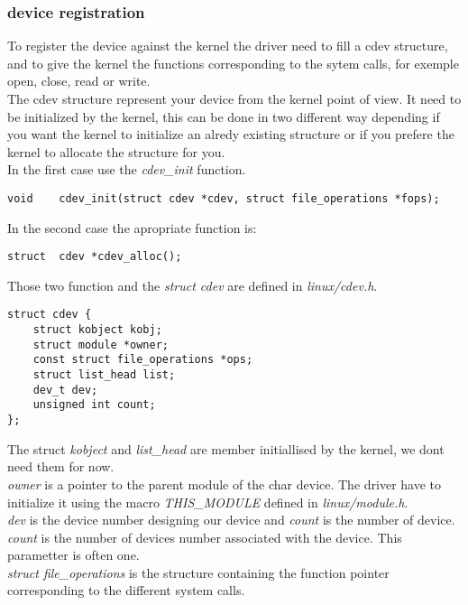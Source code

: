 \documentclass[11pt]{report}
\begin{document}
\subsubsection{device registration}
To register the device against the kernel the driver need to fill a cdev
structure, and to give the kernel the functions corresponding to the sytem
calls, for exemple open, close, read or write.\\
The cdev structure represent your device from the kernel point of view.
It need to be initialized by the kernel, this can be done in two
different way depending if you want the kernel to initialize an alredy existing
structure or if you prefere the kernel to allocate the structure for you.\\
In the first case use the {\it cdev\_init} function.
\begin{lstlisting}
void    cdev_init(struct cdev *cdev, struct file_operations *fops);
\end{lstlisting}
In the second case the apropriate function is:
\begin{lstlisting}
struct  cdev *cdev_alloc();
\end{lstlisting}
Those two function and the {\it struct cdev} are defined in {\it linux/cdev.h}.
\begin{lstlisting}
struct cdev {
	struct kobject kobj;
	struct module *owner;
	const struct file_operations *ops;
	struct list_head list;
	dev_t dev;
	unsigned int count;
};
\end{lstlisting}
The struct {\it kobject} and {\it list\_head} are member initiallised by the kernel, we dont need
them for now.\\
{\it owner} is a pointer to the parent module of the char device. The driver
have to initialize it using the macro {\it THIS\_MODULE} defined in {\it
linux/module.h}.\\
{\it dev} is the device number designing our device and {\it count} is the
number of device.\\
 {\it count} is the number of devices number associated with the device. This
 parametter is often one.\\
{\it struct file\_operations} is the structure containing the function pointer
corresponding to the different system calls.\\
\end{document}
